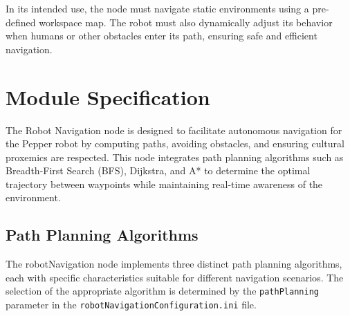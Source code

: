 \documentclass{CSSRforAfrica}
\begin{document}
\noindent In its intended use, the node must navigate static environments using a pre-defined workspace map. The robot must also dynamically adjust its behavior when humans or other obstacles enter its path, ensuring safe and efficient navigation.


\newpage

\section{Module Specification}
The Robot Navigation node is designed to facilitate autonomous navigation for the Pepper robot by computing paths, avoiding obstacles, and ensuring cultural proxemics are respected. This node integrates path planning algorithms such as Breadth-First Search (BFS), Dijkstra, and A* to determine the optimal trajectory between waypoints while maintaining real-time awareness of the environment.

\subsection*{Path Planning Algorithms}
The robotNavigation node implements three distinct path planning algorithms, each with specific characteristics suitable for different navigation scenarios. The selection of the appropriate algorithm is determined by the \texttt{pathPlanning} parameter in the \texttt{robotNavigationConfiguration.ini} file. \\
\end{document}
